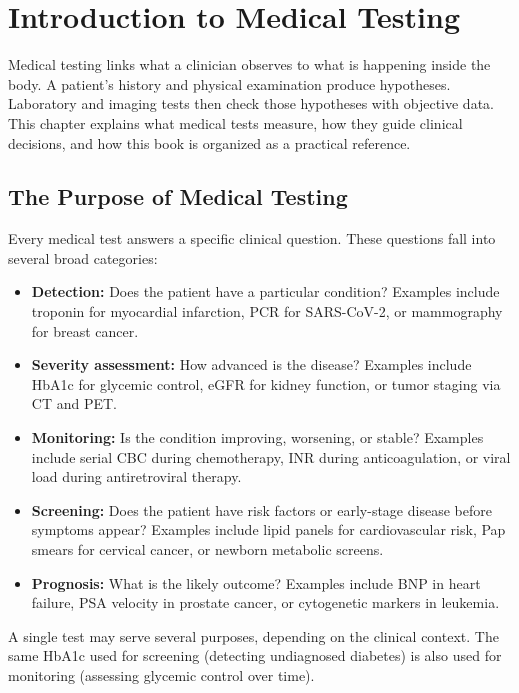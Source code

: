 \chapter{Introduction to Medical Testing}

Medical testing links what a clinician observes to what is happening inside the body. A patient's history and physical examination produce hypotheses. Laboratory and imaging tests then check those hypotheses with objective data. This chapter explains what medical tests measure, how they guide clinical decisions, and how this book is organized as a practical reference.

\clearpage
\section{The Purpose of Medical Testing}

Every medical test answers a specific clinical question. These questions fall into several broad categories:

\begin{itemize}
    \item \textbf{Detection:} Does the patient have a particular condition? Examples include troponin for myocardial infarction, PCR for SARS-CoV-2, or mammography for breast cancer.
    \item \textbf{Severity assessment:} How advanced is the disease? Examples include HbA1c for glycemic control, eGFR for kidney function, or tumor staging via CT and PET.
    \item \textbf{Monitoring:} Is the condition improving, worsening, or stable? Examples include serial CBC during chemotherapy, INR during anticoagulation, or viral load during antiretroviral therapy.
    \item \textbf{Screening:} Does the patient have risk factors or early-stage disease before symptoms appear? Examples include lipid panels for cardiovascular risk, Pap smears for cervical cancer, or newborn metabolic screens.
    \item \textbf{Prognosis:} What is the likely outcome? Examples include BNP in heart failure, PSA velocity in prostate cancer, or cytogenetic markers in leukemia.
\end{itemize}

A single test may serve several purposes, depending on the clinical context. The same HbA1c used for screening (detecting undiagnosed diabetes) is also used for monitoring (assessing glycemic control over time).

